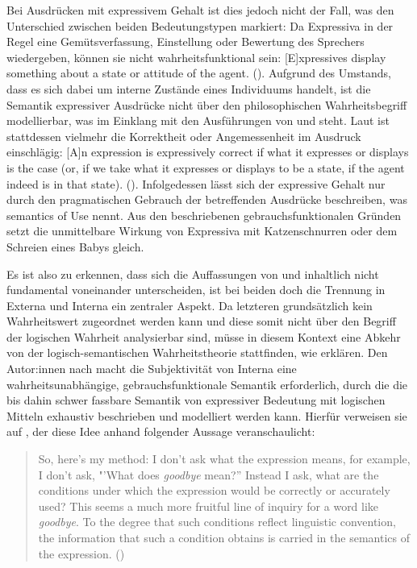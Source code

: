 Bei Ausdrücken mit expressivem Gehalt ist dies jedoch nicht der Fall, was den Unterschied zwischen beiden Bedeutungstypen markiert: Da Expressiva in der Regel eine Gemütsverfassung, Einstellung oder Bewertung des Sprechers wiedergeben, können sie nicht wahrheitsfunktional sein: \glqq{}[E]xpressives display something about a state or attitude of the agent.\grqq{} (\citealt[5]{Kaplan.1997}). Aufgrund des Umstands, dass es sich dabei um interne Zustände eines Individuums handelt, ist die Semantik expressiver Ausdrücke nicht über den philosophischen Wahrheitsbegriff modellierbar, was im Einklang mit den Ausführungen von \citet[155]{Hayner.1956} und {\citet[333]{Lang.1983}} steht. Laut {\citet[]{Kaplan.1997}} ist stattdessen vielmehr die Korrektheit oder Angemessenheit im Ausdruck einschlägig: \glqq{}[A]n expression is expressively correct if what it expresses or displays is the case (or, if we take what it expresses or displays to be a state, if the agent indeed is in that state).\grqq{} {(\citealt[5]{Kaplan.1997})}.
Infolgedessen lässt sich der expressive Gehalt nur durch den pragmatischen Gebrauch der betreffenden Ausdrücke beschreiben, was {\citet[11:40]{Kaplan.2004}} \glqq{}semantics of Use\grqq{} nennt. Aus den beschriebenen gebrauchsfunktionalen Gründen setzt \citet[57]{Cruse.2004} die unmittelbare Wirkung von Expressiva mit Katzenschnurren oder dem Schreien eines Babys gleich.

Es ist also zu erkennen, dass sich die Auffassungen von \citet[]{Lang.1983} und {\citet[]{Kaplan.1997}} inhaltlich nicht fundamental voneinander unterscheiden, ist bei beiden doch die Trennung in Externa und Interna ein zentraler Aspekt. Da letzteren grundsätzlich kein Wahrheitswert zugeordnet werden kann und diese somit nicht über den Begriff der logischen Wahrheit analysierbar sind, müsse in diesem Kontext eine Abkehr von der logisch-semantischen Wahrheitstheorie stattfinden, wie \citet[2]{dAvis.2019b} erklären. Den Autor:innen nach macht die  Subjektivität von Interna eine wahrheitsunabhängige, gebrauchsfunktionale Semantik erforderlich, durch die die bis dahin schwer fassbare Semantik von expressiver Bedeutung mit logischen Mitteln exhaustiv beschrieben und modelliert werden kann. Hierfür verweisen sie auf {\citet[]{Kaplan.2004}}, der diese Idee anhand folgender Aussage veranschaulicht:

\begin{quotation} \noindent So, here’s my method: I don’t ask what the expression means, for example, I don’t ask, "'What does \textit{goodbye} mean?'' Instead I ask, what are the conditions under which the expression would be correctly or accurately used? This seems a much more fruitful line of inquiry for a word like \textit{goodbye}. To the degree that such conditions reflect linguistic convention, the information that such a condition obtains is carried in the semantics of
the expression. \hfill (\citealt[14:33]{Kaplan.2004})  \end{quotation}

